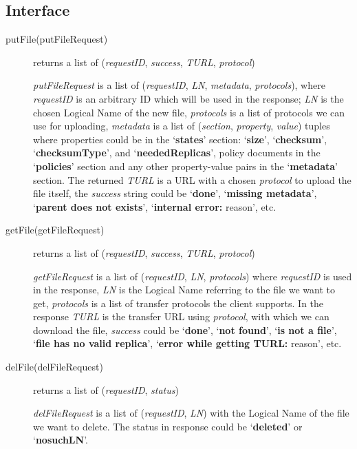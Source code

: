 \documentclass{book}
\begin{document}

\subsection{Interface} %

\begin{description}
    \item[putFile(putFileRequest)] returns a list of (\emph{requestID}, \emph{success}, \emph{TURL}, \emph{protocol})
    
    \emph{putFileRequest} is a list of (\emph{requestID}, \emph{LN}, \emph{metadata}, \emph{protocols}), where \emph{requestID} is an arbitrary ID which will be used in the response; \emph{LN} is the chosen Logical Name of the new file, \emph{protocols} is a list of protocols we can use for uploading, \emph{metadata} is a list of (\emph{section}, \emph{property}, \emph{value}) tuples where properties could be in the `\textbf{states}' section: `\textbf{size}', `\textbf{checksum}', `\textbf{checksumType}', and  `\textbf{neededReplicas}', policy documents in the `\textbf{policies}' section and any other property-value pairs in the `\textbf{metadata}' section. The returned \emph{TURL} is a URL with a chosen \emph{protocol} to upload the file itself, the \emph{success} string could be `\textbf{done}', `\textbf{missing metadata}', `\textbf{parent does not exists}', `\textbf{internal error:} reason', etc.

    \item[getFile(getFileRequest)] returns a list of (\emph{requestID}, \emph{success}, \emph{TURL}, \emph{protocol})

    \emph{getFileRequest} is a list of (\emph{requestID}, \emph{LN}, \emph{protocols}) where \emph{requestID} is used in the response, \emph{LN} is the Logical Name referring to the file we want to get, \emph{protocols} is a list of transfer protocols the client supports.
    In the response \emph{TURL} is the transfer URL using \emph{protocol}, with which we can download the file, \emph{success} could be `\textbf{done}', `\textbf{not found}', `\textbf{is not a file}', `\textbf{file has no valid replica}', `\textbf{error while getting TURL:} reason', etc.

    \item[delFile(delFileRequest)] returns a list of (\emph{requestID}, \emph{status})
    
    \emph{delFileRequest} is a list of (\emph{requestID}, \emph{LN}) with the Logical Name of the file we want to delete. The status in response could be `\textbf{deleted}' or `\textbf{nosuchLN}'.
    

\end{description}
\end{document}
